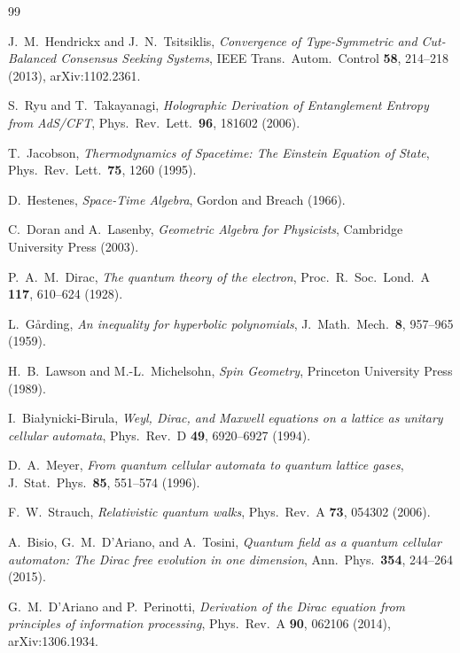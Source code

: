 \documentclass[12pt]{article}
\theoremstyle{definition}
\theoremstyle{remark}
\begin{document}
\begin{thebibliography}{99}
\raggedright

J.~M.~Hendrickx and J.~N.~Tsitsiklis, \emph{Convergence of Type-Symmetric and Cut-Balanced Consensus Seeking Systems}, IEEE Trans.\ Autom.\ Control \textbf{58}, 214--218 (2013), arXiv:1102.2361.

S.~Ryu and T.~Takayanagi, \emph{Holographic Derivation of Entanglement Entropy from AdS/CFT}, Phys.\ Rev.\ Lett.\ \textbf{96}, 181602 (2006).

T.~Jacobson, \emph{Thermodynamics of Spacetime: The Einstein Equation of State}, Phys.\ Rev.\ Lett.\ \textbf{75}, 1260 (1995).

D.~Hestenes, \emph{Space-Time Algebra}, Gordon and Breach (1966).

C.~Doran and A.~Lasenby, \emph{Geometric Algebra for Physicists}, Cambridge University Press (2003).

P.~A.~M.~Dirac, \emph{The quantum theory of the electron}, Proc.\ R.\ Soc.\ Lond.\ A \textbf{117}, 610--624 (1928).

L.~G{\aa}rding, \emph{An inequality for hyperbolic polynomials}, J.\ Math.\ Mech.\ \textbf{8}, 957--965 (1959).

H.~B.~Lawson and M.-L.~Michelsohn, \emph{Spin Geometry}, Princeton University Press (1989).

I.~Bia{\l}ynicki-Birula, \emph{Weyl, Dirac, and Maxwell equations on a lattice as unitary cellular automata}, Phys.\ Rev.\ D \textbf{49}, 6920--6927 (1994).

D.~A.~Meyer, \emph{From quantum cellular automata to quantum lattice gases}, J.\ Stat.\ Phys.\ \textbf{85}, 551--574 (1996).

F.~W.~Strauch, \emph{Relativistic quantum walks}, Phys.\ Rev.\ A \textbf{73}, 054302 (2006).

A.~Bisio, G.~M.~D'Ariano, and A.~Tosini, \emph{Quantum field as a quantum cellular automaton: The Dirac free evolution in one dimension}, Ann.\ Phys.\ \textbf{354}, 244--264 (2015).

G.~M.~D'Ariano and P.~Perinotti, \emph{Derivation of the Dirac equation from principles of information processing}, Phys.\ Rev.\ A \textbf{90}, 062106 (2014), arXiv:1306.1934.


\end{thebibliography}
\end{document}
